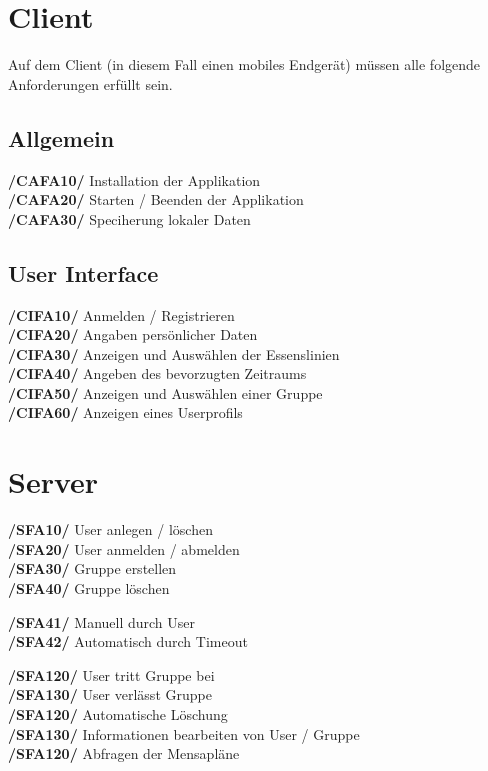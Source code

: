 \documentclass[a4paper]{scrreprt}
\begin{document}
\section{Client}
Auf dem Client (in diesem Fall einen mobiles Endgerät) müssen alle folgende Anforderungen erfüllt sein. 

\subsection{Allgemein}

\begin{addmargin}[25pt]{0pt} 
\textbf{/CAFA10/} Installation der Applikation \\
\textbf{/CAFA20/} Starten / Beenden der Applikation\\
\textbf{/CAFA30/} Speciherung lokaler Daten\\
\end{addmargin}

\subsection{User Interface}

\begin{addmargin}[25pt]{0pt} 
\textbf{/CIFA10/} Anmelden / Registrieren \\
\textbf{/CIFA20/} Angaben persönlicher Daten\\
\textbf{/CIFA30/} Anzeigen und Auswählen der Essenslinien\\
\textbf{/CIFA40/} Angeben des bevorzugten Zeitraums\\
\textbf{/CIFA50/} Anzeigen und Auswählen einer Gruppe\\
\textbf{/CIFA60/} Anzeigen eines Userprofils\\
\end{addmargin}

\section{Server}

\begin{addmargin}[25pt]{0pt} 
\textbf{/SFA10/} User anlegen / löschen\\
\textbf{/SFA20/} User anmelden / abmelden\\
\textbf{/SFA30/} Gruppe erstellen\\
\textbf{/SFA40/} Gruppe löschen\\
	\begin{addmargin}[25pt]{0pt} 
	\textbf{/SFA41/} Manuell durch User\\
	\textbf{/SFA42/} Automatisch durch Timeout\\
	\end{addmargin}
\textbf{/SFA120/} User tritt Gruppe bei\\
\textbf{/SFA130/} User verlässt Gruppe\\
\textbf{/SFA120/} Automatische Löschung\\
\textbf{/SFA130/} Informationen bearbeiten von User / Gruppe\\
\textbf{/SFA120/} Abfragen der Mensapläne\\
\end{addmargin}
\end{document}
